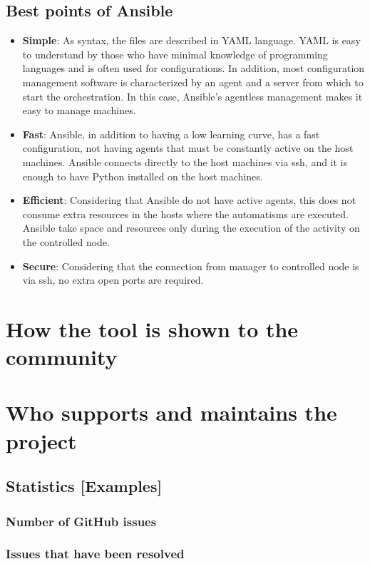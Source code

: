 \documentclass[12pt,a4paper,openright,twoside]{book}
\begin{document}
\subsection{Best points of Ansible}
\begin{itemize}
    \item \textbf{Simple}: As syntax, the files are described in YAML language. YAML is easy to understand by those who have minimal knowledge of programming languages and is often used for configurations. In addition, most configuration management software is characterized by an agent and a server from which to start the orchestration. In this case, Ansible's agentless management makes it easy to manage machines.
    \item \textbf{Fast}: Ansible, in addition to having a low learning curve, has a fast configuration, not having agents that must be constantly active on the host machines. Ansible connects directly to the host machines via ssh, and it is enough to have Python installed on the host machines.
    \item \textbf{Efficient}: Considering that Ansible do not have active agents, this does not consume extra resources in the hosts where the automatisms are executed. Ansible take space and resources only during the execution of the activity on the controlled node.
    \item \textbf{Secure}: Considering that the connection from manager to controlled node is via ssh, no extra open ports are required.
\end{itemize}

\section{How the tool is shown to the community}

\section{Who supports and maintains the project}
\subsection{Statistics [Examples]}
            \subsubsection{Number of GitHub issues}
            \subsubsection{Issues that have been resolved}
\end{document}
